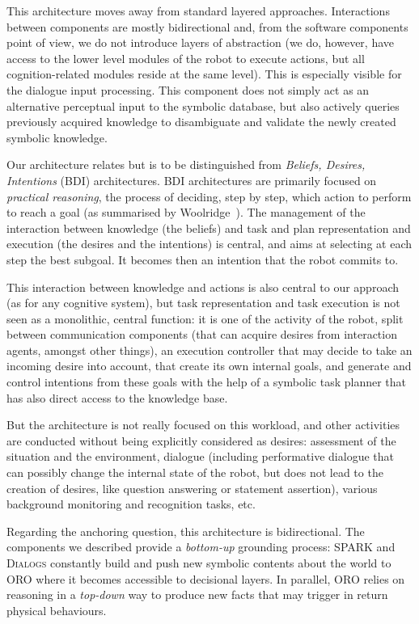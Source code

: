 This architecture moves away from standard layered approaches. Interactions
between components are mostly bidirectional and, from the software components
point of view, we do not introduce layers of abstraction (we do, however, have
access to the lower level modules of the robot to execute actions, but all
cognition-related modules reside at the same level). This is especially visible
for the dialogue input processing. This component does not simply act as an
alternative perceptual input to the symbolic database, but also actively
queries previously acquired knowledge to disambiguate and validate the newly
created symbolic knowledge.

Our architecture relates but is to be distinguished from \emph{Beliefs,
Desires, Intentions} (BDI) architectures. BDI architectures are primarily
focused on \emph{practical reasoning}, \ie the process of deciding, step by
step, which action to perform to reach a goal (as summarised by
Woolridge~\cite{Woolridge1999}). The management of the interaction between
knowledge (the beliefs) and task and plan representation and execution (the
desires and the intentions) is central, and aims at selecting at each step the
best subgoal. It becomes then an intention that the robot commits to.

This interaction between knowledge and actions is also central to our approach
(as for any cognitive system), but task representation and task execution is
not seen as a monolithic, central function: it is one of the activity of the
robot, split between communication components (that can acquire desires from
interaction agents, amongst other things), an execution controller that may
decide to take an incoming desire into account, that create its own internal
goals, and generate and control intentions from these goals with the help of a
symbolic task planner that has also direct access to the knowledge base.

But the architecture is not really focused on this workload, and other
activities are conducted without being explicitly considered as desires:
assessment of the situation and the environment, dialogue (including
performative dialogue that can possibly change the internal state of the robot,
but does not lead to the creation of desires,  like question answering or
statement assertion), various background monitoring and recognition tasks, etc.

Regarding the anchoring question, this architecture is bidirectional. The
components we described provide a \textit{bottom-up} grounding process: SPARK
and \textsc{Dialogs} constantly build and push new symbolic contents about the
world to ORO where it becomes accessible to decisional layers. In parallel, ORO
relies on reasoning in a \textit{top-down} way to produce new facts that may
trigger in return physical behaviours. 

